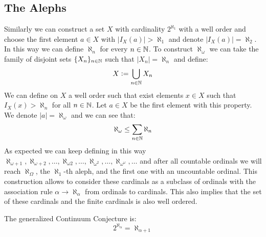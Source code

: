 \documentclass[11pt,a4paper]{article}
\begin{document}
	\subsection{The Alephs}
	Similarly we can construct a set $X$ with cardinality $2^{\aleph_1}$ with a
	well order and choose the first element $a \in X$ with 
	$|I_X(a)| > \aleph_1$ and denote $|I_X(a)| = \aleph_2$. In this
	way we can define $\aleph_n$ for every $n \in \mathbb{N}$. To construct
	$\aleph_\omega$ we can take the family of disjoint sets 
	$\{X_n\}_{n \in \mathbb{N}}$ such that $|X_n| = \aleph_n$ and define:
	\[
		X := \bigcup_{n \in \mathbb{N}}{X_n}
	\]
	We can define on $X$ a well order such that exist elements $x \in X$
	such that $I_X(x) > \aleph_n$ for all $n \in \mathbb{N}$. Let $a \in X$ be
	the first element with this property. We denote $|a| = \aleph_\omega$ 
	and we can see that:
	\[
		\aleph_\omega \le \sum_{n\in\mathbb{N}}{\aleph_n}
	\]
	As expected we can keep defining in this way 
	$\aleph_{\omega+1}, \aleph_{\omega+2},\dots,\aleph_{\omega2},\dots,
	\aleph_{\omega^2},\dots,\aleph_{\omega^\omega},\dots$ and after all 
	countable ordinals we will reach $\aleph_\Omega$, the $\aleph_1$-th 
	aleph, and the first one with an uncountable ordinal. This construction
	allows to consider these cardinals as a subclass of ordinals with the
	association rule $\alpha \to \aleph_\alpha$ from ordinals to cardinals.
	This also implies that the set of these cardinals and the finite
	cardinals is also well ordered.
	
	\begin{remark}
		The generalized Continuum Conjecture is:
		\[
			2^{\aleph_\alpha}=\aleph_{\alpha+1}
		\]
	\end{remark}
	
	\newpage
	
\end{document}
